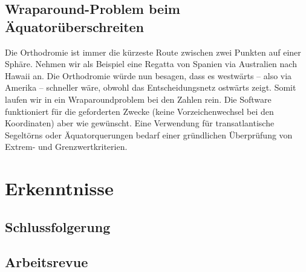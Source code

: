 \subsection{Wraparound-Problem beim Äquatorüberschreiten}
Die Orthodromie ist immer die kürzeste Route zwischen zwei Punkten auf einer
Sphäre. Nehmen wir als Beispiel eine Regatta von Spanien via Australien nach
Hawaii an. Die Orthodromie würde nun besagen, dass es westwärts -- also via
Amerika -- schneller wäre, obwohl das Entscheidungsnetz ostwärts zeigt. Somit
laufen wir in ein Wraparoundproblem bei den Zahlen rein. Die Software
funktioniert für die geforderten Zwecke (keine Vorzeichenwechsel bei den
Koordinaten) aber wie gewünscht. Eine Verwendung für transatlantische
Segeltörns oder Äquatorquerungen bedarf einer gründlichen Überprüfung von
Extrem- und Grenzwertkriterien.


\section{Erkenntnisse}
\subsection{Schlussfolgerung}
\subsection{Arbeitsrevue}
